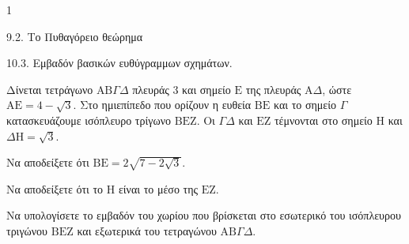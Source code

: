 \begin{ylh}{1}
    \item 9.2. Το Πυθαγόρειο θεώρημα
    \item 10.3. Εμβαδόν βασικών ευθύγραμμων σχημάτων.
\end{ylh}
\begin{figure}
\end{figure}
Δίνεται τετράγωνο $\text{AB}\Gamma\Delta$ πλευράς $3$ και σημείο $\text{E}$ της πλευράς $\text{A}\Delta$, ώστε $\text{AE} = 4 - \sqrt{3}$. Στο ημιεπίπεδο που ορίζουν η ευθεία $\text{BE}$ και το σημείο $\Gamma$ κατασκευάζουμε ισόπλευρο τρίγωνο $\text{BEZ}$. Οι $\Gamma\Delta$ και $\text{EZ}$ τέμνονται στο σημείο $\text{H}$ και $\Delta\text{H} = \sqrt{3}$.
\begin{alist}
    \item Να αποδείξετε ότι $\text{BE} = 2\sqrt{7 - 2\sqrt{3}}$. 
    \item Να αποδείξετε ότι το $\text{H}$ είναι το μέσο της $\text{EZ}$. 
    \item Να υπολογίσετε το εμβαδόν του χωρίου που βρίσκεται στο εσωτερικό του ισόπλευρου τριγώνου $\text{BEZ}$ και εξωτερικά του τετραγώνου $\text{AB}\Gamma\Delta$. 
\end{alist}